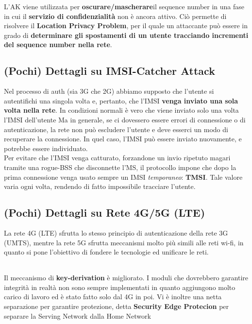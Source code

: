 \begin{corollary}
L'AK viene utilizzata per \textbf{oscurare/mascherare}\footnotemark il sequence number in una fase in cui il \textbf{servizio di confidenzialità} non è ancora attivo. Ciò permette di risolvere il \textbf{Location Privacy Problem}, per il quale un attaccante può essere in grado di \textbf{determinare gli spostamenti di un utente tracciando incrementi del sequence number nella rete}.
\end{corollary}
\subsection{(Pochi) Dettagli su IMSI-Catcher Attack}
Nel processo di auth (sia 3G che 2G) abbiamo supposto che l'utente si autentifichi una singola volta e, pertanto, che l'IMSI \textbf{venga inviato una sola volta nella rete}.
In condizioni normali è vero che viene inviato solo una volta l'IMSI dell'utente
Ma in generale, se ci dovessero essere errori di connessione o di autenticazione, la rete non può escludere l'utente e deve esserci un modo di recuperare la connessione. In quel caso, l'IMSI può essere inviato nuovamente, e potrebbe essere individuato.\\
Per evitare che l'IMSI venga catturato, forzandone un invio ripetuto magari tramite una rogue-BSS che disconnette l'MS, il protocollo impone che dopo la prima connessione venga usato sempre un IMSI \textit{temporaneo}: \textbf{TMSI}. Tale valore varia ogni volta, rendendo di fatto impossibile tracciare l'utente.

\subsection{(Pochi) Dettagli su Rete 4G/5G (LTE)}
La rete 4G (LTE) sfrutta lo stesso principio di autenticazione della rete 3G (UMTS), mentre la rete 5G sfrutta meccanismi molto più simili alle reti wi-fi, in quanto si pone l'obiettivo di fondere le tecnologie ed unificare le reti. 
\begin{note}[Riguardo 5G]\\
Il meccanismo di \textbf{key-derivation} è migliorato. I moduli che dovrebbero garantire integrità in realtà non sono sempre implementati in quanto aggiungono molto carico di lavoro ed è stato fatto solo dal 4G in poi. Vi è inoltre una netta separazione per garantire protezione, detta \textbf{Security Edge Protecion} per separare la Serving Network dalla Home Network
\end{note}
